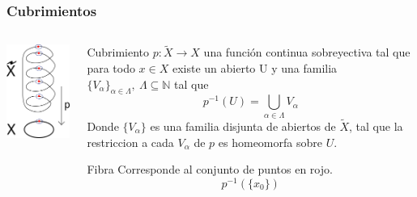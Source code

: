 \documentclass[xetex,mathserif,serif]{beamer}
\begin{document}
  \begin{frame}
    \frametitle{Cubrimientos}
    \begin{columns}
      \begin{column}{0.3\textwidth}
        \centering
        \includegraphics[scale=.8]{../tesis/imagenes/spring.png}
      \end{column}
      \begin{column}{0.7\textwidth}
        \begin{block}{Cubrimiento}
          \(p : \tilde{X} \to X\) una función continua sobreyectiva tal
          que para todo \(x \in X\) existe un abierto U y una familia
          \(\{V_\alpha\}_{\alpha \in \Lambda},\ \Lambda \subseteq \mathbb N\) tal
          que
          \[ p^{-1} (U) = \bigcup_{\alpha \in \Lambda} V_\alpha \]
          Donde \(\{V_\alpha\}\) es una familia disjunta de abiertos de
          \(\tilde X\), tal que
          la restriccion a cada \(V_\alpha\) de \(p\) es
          homeomorfa sobre \(U\).
        \end{block}
        \begin{block}{Fibra}
          Corresponde al conjunto de puntos en rojo.
          \[ p^{-1} \left( \{x_0\} \right) \]
        \end{block}
      \end{column}
    \end{columns}
  \end{frame}
\end{document}
